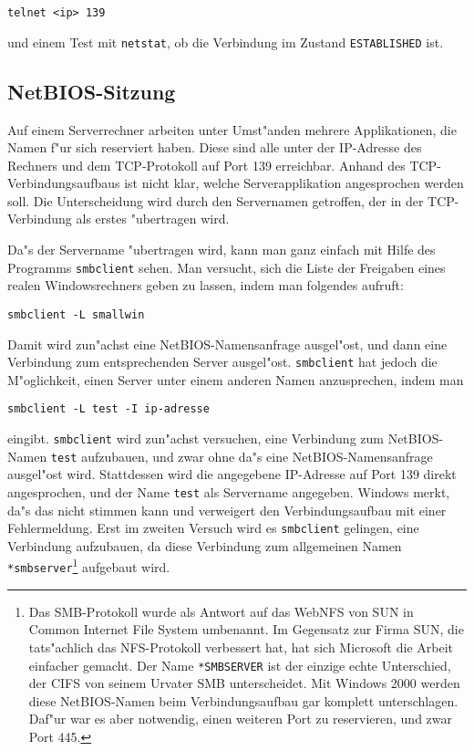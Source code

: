 \documentclass{scrartcl}\usepackage{pslatex}\typearea{12}
\newcommand{\prog}{\texttt}
\begin{document}
\begin{verbatim}
telnet <ip> 139
\end{verbatim}

\noindent und einem Test mit \prog{netstat}, ob die Verbindung
im Zustand \prog{ESTABLISHED} ist.

\subsection{NetBIOS-Sitzung}

Auf einem Serverrechner arbeiten unter Umst"anden mehrere
Applikationen, die Namen f"ur sich reserviert haben. Diese sind alle
unter der IP-Adresse des Rechners und dem TCP-Protokoll auf Port 139
erreichbar. Anhand des TCP-Verbindungsaufbaus ist nicht klar, welche
Serverapplikation angesprochen werden soll. Die Unterscheidung wird
durch den Servernamen getroffen, der in der TCP-Verbindung als erstes
"ubertragen wird.

Da"s der Servername "ubertragen wird, kann man ganz einfach mit Hilfe
des Programms \prog{smbclient} sehen. Man versucht, sich die Liste der
Freigaben eines realen Windowsrechners geben zu lassen, indem man
folgendes aufruft:

\verb|smbclient -L smallwin|

Damit wird zun"achst eine NetBIOS-Namensanfrage ausgel"ost, und dann
eine Verbindung zum entsprechenden Server ausgel"ost. \prog{smbclient}
hat jedoch die M"oglichkeit, einen Server unter einem anderen Namen
anzusprechen, indem man

\verb|smbclient -L test -I ip-adresse|

\noindent
eingibt. \prog{smbclient} wird zun"achst versuchen, eine Verbindung
zum NetBIOS-Namen \texttt{test} aufzubauen, und zwar ohne da"s eine
NetBIOS-Namensanfrage ausgel"ost wird. Stattdessen wird die angegebene
IP-Adresse auf Port 139 direkt angesprochen, und der Name
\texttt{test} als Servername angegeben. Windows merkt, da"s das nicht
stimmen kann und verweigert den Verbindungsaufbau mit einer
Fehlermeldung. Erst im zweiten Versuch wird es \prog{smbclient}
gelingen, eine Verbindung aufzubauen, da diese Verbindung zum
allgemeinen Namen \texttt{*smbserver}\footnote{Das SMB-Protokoll wurde
  als Antwort auf das WebNFS von SUN in Common Internet File System
  umbenannt.  Im Gegensatz zur Firma SUN, die tats"achlich das
  NFS-Protokoll verbessert hat, hat sich Microsoft die Arbeit
  einfacher gemacht. Der Name \texttt{*SMBSERVER} ist der einzige
  echte Unterschied, der CIFS von seinem Urvater SMB unterscheidet.
  Mit Windows 2000 werden diese NetBIOS-Namen beim Verbindungsaufbau
  gar komplett unterschlagen. Daf"ur war es aber notwendig, einen
  weiteren Port zu reservieren, und zwar Port 445.} aufgebaut wird.
\end{document}
